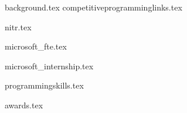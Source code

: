 \documentclass[11pt]{article}
\begin{document}
{background.tex}
{competitiveprogramminglinks.tex}

\vspace{0.3cm}

{nitr.tex}


{microsoft_fte.tex}

{microsoft_internship.tex}


{programmingskills.tex}


{awards.tex}
\end{document}
